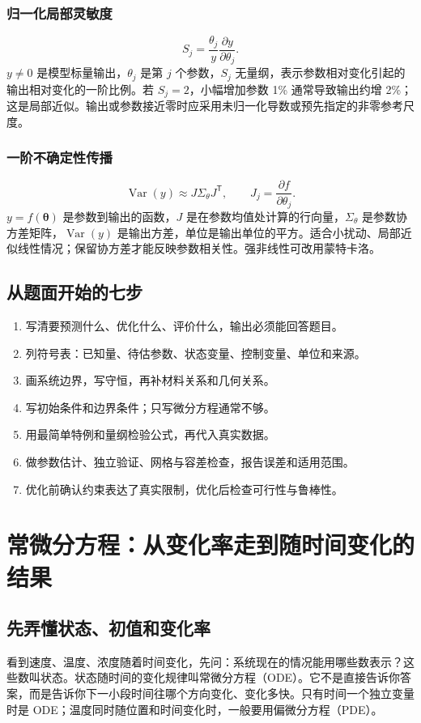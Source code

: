\documentclass[UTF8,zihao=-4,openany,oneside,fontset=windows]{ctexbook}
\begin{document}
\subsection{归一化局部灵敏度}
\begin{equation}S_j=\frac{\theta_j}{y}\frac{\partial y}{\partial\theta_j}.\end{equation}
$y\ne0$ 是模型标量输出，$\theta_j$ 是第 $j$ 个参数，$S_j$ 无量纲，表示参数相对变化引起的输出相对变化的一阶比例。若 $S_j=2$，小幅增加参数 1\% 通常导致输出约增 2\%；这是局部近似。输出或参数接近零时应采用未归一化导数或预先指定的非零参考尺度。
\subsection{一阶不确定性传播}
\begin{equation}\operatorname{Var}(y)\approx J\Sigma_\theta J^\mathsf T,\qquad J_j=\frac{\partial f}{\partial\theta_j}.\end{equation}
$y=f(\boldsymbol\theta)$ 是参数到输出的函数，$J$ 是在参数均值处计算的行向量，$\Sigma_\theta$ 是参数协方差矩阵，$\operatorname{Var}(y)$ 是输出方差，单位是输出单位的平方。适合小扰动、局部近似线性情况；保留协方差才能反映参数相关性。强非线性可改用蒙特卡洛。

\section{从题面开始的七步}
\begin{enumerate}
\item 写清要预测什么、优化什么、评价什么，输出必须能回答题目。
\item 列符号表：已知量、待估参数、状态变量、控制变量、单位和来源。
\item 画系统边界，写守恒，再补材料关系和几何关系。
\item 写初始条件和边界条件；只写微分方程通常不够。
\item 用最简单特例和量纲检验公式，再代入真实数据。
\item 做参数估计、独立验证、网格与容差检查，报告误差和适用范围。
\item 优化前确认约束表达了真实限制，优化后检查可行性与鲁棒性。
\end{enumerate}

\chapter{常微分方程：从变化率走到随时间变化的结果}
\section{先弄懂状态、初值和变化率}
看到速度、温度、浓度随着时间变化，先问：系统现在的情况能用哪些数表示？这些数叫状态。状态随时间的变化规律叫常微分方程（ODE）。它不是直接告诉你答案，而是告诉你下一小段时间往哪个方向变化、变化多快。只有时间一个独立变量时是 ODE；温度同时随位置和时间变化时，一般要用偏微分方程（PDE）。
\end{document}
